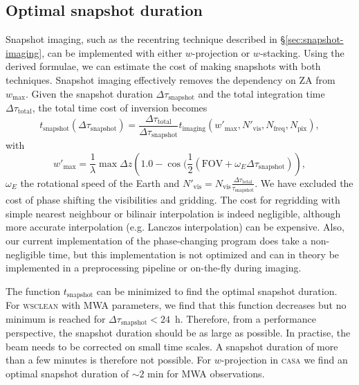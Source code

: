 \documentclass[useAMS,usenatbib]{mn2e}
\begin{document}
\subsection{Optimal snapshot duration}
Snapshot imaging, such as the recentring technique described in \S\ref{sec:snapshot-imaging}, can be implemented with either $w$-projection or $w$-stacking. Using the derived formulae, we can estimate the cost of making snapshots with both techniques. Snapshot imaging effectively removes the dependency on ZA from $w_{\max}$. Given the snapshot duration $\Delta \tau_\textrm{snapshot}$ and the total integration time $\Delta \tau_\textrm{total}$, the total time cost of inversion becomes
\begin{equation} \label{eq:snapshot-cost}
t_\textrm{snapshot}(\Delta \tau_\textrm{snapshot}) = \frac{\Delta \tau_\textrm{total}}{\Delta \tau_\textrm{snapshot}} t_\textrm{imaging}(w'_{\max},N'_\textrm{vis},N_\textrm{freq},N_\textrm{pix}),
\end{equation}
with
\begin{equation}
w'_{\max} = \frac{1}{\lambda}\max \Delta z \left(1.0 - \cos(\frac{1}{2}(\textrm{FOV} + \omega_E \Delta \tau_\textrm{snapshot})\right),
\end{equation}
$\omega_E$ the rotational speed of the Earth and $N'_\textrm{vis} = N_\textrm{vis}\frac{\Delta \tau_\textrm{total}}{\tau_\textrm{snapshot}}$. We have excluded the cost of phase shifting the visibilities and gridding. The cost for regridding with simple nearest neighbour or bilinair interpolation is indeed negligible, although more accurate interpolation (e.g. Lanczos interpolation) can be expensive. Also, our current implementation of the phase-changing program does take a non-negligible time, but this implementation is not optimized and can in theory be implemented in a preprocessing pipeline or on-the-fly during imaging.

The function $t_\textrm{snapshot}$ can be minimized to find the optimal snapshot duration. For \textsc{wsclean} with MWA parameters, we find that this function decreases but no minimum is reached for $\Delta \tau_\textrm{snapshot}<24$~h. Therefore, from a performance perspective, the snapshot duration should be as large as possible. In practise, the beam needs to be corrected on small time scales. A snapshot duration of more than a few minutes is therefore not possible. For $w$-projection in \textsc{casa} we find an optimal snapshot duration of $\sim2$ min for MWA observations.
\end{document}

